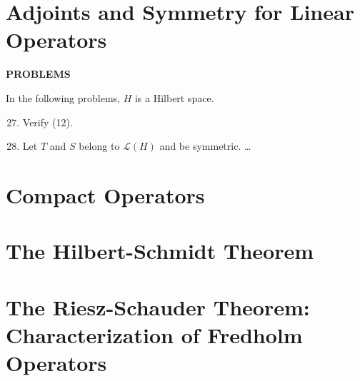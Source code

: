 \section{Adjoints and Symmetry for Linear Operators}
\begin{center}
	\textbf{PROBLEMS}
\end{center}
In the following problems, $H$ is a Hilbert space.
\begin{enumerate}
	\setcounter{enumi}{26}
    \item Verify (12).
    \item Let $T$ and $S$ belong to $\mathcal{L}(H)$ and be symmetric. \dots
\end{enumerate}

\section{Compact Operators}

\section{The Hilbert-Schmidt Theorem}

\section{The Riesz-Schauder Theorem: Characterization of Fredholm Operators}
